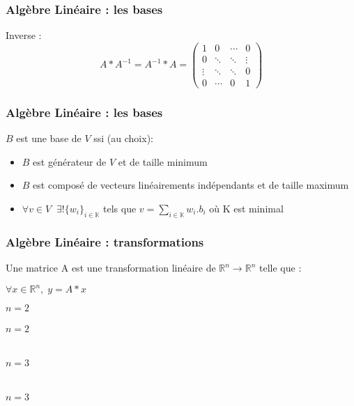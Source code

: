\documentclass{formation}
\begin{document}
\begin{frame}
  \frametitle{Algèbre Linéaire : les bases}
  Inverse : \\
  \[
  A*A^{-1} = A^{-1}*A =
  \begin{pmatrix}
    1 & 0 & \cdots & 0 \\
    0 & \ddots & \ddots & \vdots \\
    \vdots & \ddots & \ddots & 0\\
    0 & \cdots & 0 & 1
  \end{pmatrix}
  \]
\end{frame}

\begin{frame}
  \frametitle{Algèbre Linéaire : les bases}
    $B$ est une base de $V$ ssi (au choix):
    \begin{itemize}
    \item $B$ est générateur de $V$ et de taille minimum
    \item $B$ est composé de vecteurs linéairements indépendants et de taille maximum
    \item $\forall v\in V \;\; \exists! \{{w_i}\}_{i\in\mathbb{K}}$ tels que $v = \sum_{i\in\mathbb{K}} w_i . b_i$ où K est minimal
    \end{itemize}
\end{frame}

\begin{frame}
  \frametitle{Algèbre Linéaire : transformations}
  Une matrice A est une transformation linéaire de $\mathbb{R}^n \rightarrow \mathbb{R}^n$ telle que : 
  \begin{center}
    $\forall x \in \mathbb{R}^n,\;y = A*x$\\
  \end{center}
  \begin{minipage}[r]{0.25\linewidth}
  $n=2$\\
  \\
  $n=2$\\
  \\
  \\
  $n=3$\\
  \\
  \\
  $n=3$\\
  \end{minipage}\hfill
  \begin{minipage}[l]{0.74\linewidth}
  \end{minipage}\hfill
\end{frame}
\end{document}
